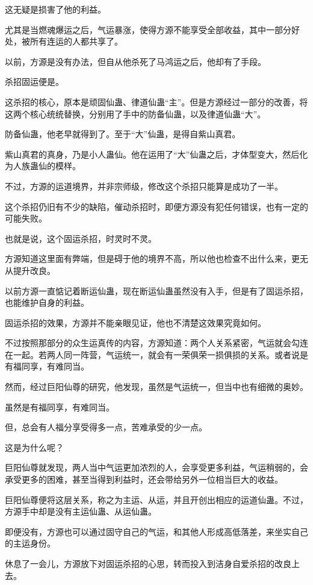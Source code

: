 \begin{this_body}
这无疑是损害了他的利益。

尤其是当燃魂爆运之后，气运暴涨，使得方源不能享受全部收益，其中一部分好处，被所有连运的人都共享了。

以前，方源是没有办法，但自从他杀死了马鸿运之后，他却有了手段。

杀招固运便是。

这杀招的核心，原本是顽固仙蛊、律道仙蛊“主”。但是方源经过一部分的改善，将这两个核心统统替换，分别用了手中的防备仙蛊，以及律道仙蛊“大”。

防备仙蛊，他老早就得到了。至于“大”仙蛊，是得自紫山真君。

紫山真君的真身，乃是小人蛊仙。他在运用了“大”仙蛊之后，才体型变大，然后化为人族蛊仙的模样。

不过，方源的运道境界，并非宗师级，修改这个杀招只能算是成功了一半。

这个杀招仍旧有不少的缺陷，催动杀招时，即便方源没有犯任何错误，也有一定的可能失败。

也就是说，这个固运杀招，时灵时不灵。

方源知道这里面有弊端，但是碍于他的境界不高，所以他也检查不出什么来，更无从提升改良。

以前方源一直惦记着断运仙蛊，现在断运仙蛊虽然没有入手，但是有了固运杀招，也能维护自身的利益。

固运杀招的效果，方源并不能亲眼见证，他也不清楚这效果究竟如何。

不过按照那部分的众生运真传的内容，方源知道：两个人关系紧密，气运就会勾连在一起。若两人同一阵营，气运统一，就会有一荣俱荣一损俱损的关系。或者说是有福同享，有难同当。

然而，经过巨阳仙尊的研究，他发现，虽然是气运统一，但当中也有细微的奥妙。

虽然是有福同享，有难同当。

但，总会有人福分享受得多一点，苦难承受的少一点。

这是为什么呢？

巨阳仙尊就发现，两人当中气运更加浓烈的人，会享受更多利益，气运稍弱的，会承受更多的困难，甚至当得到利益时，还会带给另外一位相当巨大的收益。

巨阳仙尊便将这层关系，称之为主运、从运，并且开创出相应的运道仙蛊。不过，方源手中却是没有主运仙蛊、从运仙蛊。

即便没有，方源也可以通过固守自己的气运，和其他人形成高低落差，来坐实自己的主运身份。

休息了一会儿，方源放下对固运杀招的心思，转而投入到洁身自爱杀招的改良上去。


\end{this_body}
